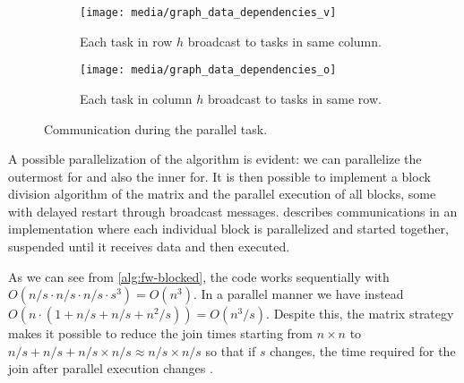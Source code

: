 \begin{figure}[htbp]
    \centering
    \begin{subfigure}[t]{0.3\textwidth}
        \centering
        \texttt{[image: media/graph\_data\_dependencies\_v]}
        \caption{Each task in row \(h\) broadcast to tasks in same column.}
        \label{fig:data-dependencies-v}
    \end{subfigure}
    \begin{subfigure}[t]{0.3\textwidth}
        \centering
        \texttt{[image: media/graph\_data\_dependencies\_o]}
        \caption{Each task in column \(h\) broadcast to tasks in same row.}
        \label{fig:data-dependencies-o}
    \end{subfigure}
    \caption{Communication during the parallel task.}
    \label{fig:communication-during-parallel-task}
\end{figure}

A possible parallelization of the algorithm is evident: we can parallelize the outermost for and also the inner for.
It is then possible to implement a block division algorithm of the matrix and the parallel execution of all blocks, some with delayed restart through broadcast messages.
  describes communications in an implementation where each individual block is parallelized and started together, suspended until it receives data and then executed.

As we can see from \cref{alg:fw-blocked}, the code works sequentially with \(O(n/s \cdot n/s \cdot n/s \cdot s^3) =O(n^3) \).
In a parallel manner we have instead \(O(n \cdot (1+n/s+n/s+ n^2/s)) = O(n^3/s)\).
Despite this, the matrix strategy makes it possible to reduce the join times starting from \(n\times n\) to \(n/s + n/s + n/s \times n/s \approx n/s \times n/s\) so that if \(s\) changes, the time required for the join after parallel execution changes \cite{rucci}.

\FloatBarrier
